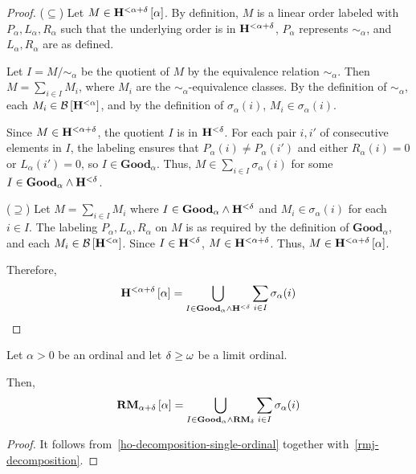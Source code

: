 \begin{proof}
  ($\subseteq$) Let $M \in \mathbf{H}^{< \alpha + \delta} \left[ {\alpha} \right]$. By definition, $M$
  is a linear order labeled with $P_\alpha, L_\alpha, R_\alpha$ such that the
  underlying order is in $\mathbf{H}^{< \alpha + \delta}$, $P_\alpha$ represents
  $\sim_\alpha$, and $L_\alpha, R_\alpha$ are as defined.

  Let $I = M / \sim_\alpha$ be the quotient of $M$ by the equivalence relation
  $\sim_\alpha$. Then $M = \sum_{i \in I} M_i$, where $M_i$ are the
  $\sim_\alpha$-equivalence classes. By the definition of $\sim_\alpha$, each
  $M_i \in \mathcal{B} \left[ {\mathbf{H}^{< \alpha}} \right]$, and by the definition of $\sigma_\alpha(i)$,
  $M_i \in \sigma_\alpha(i)$.

  Since $M \in \mathbf{H}^{< \alpha + \delta}$, the quotient $I$ is in $\mathbf{H}^{< \delta}$.
  For each pair $i, i'$ of consecutive elements in $I$, the labeling ensures that
  $P_\alpha(i) \ne P_\alpha(i')$ and either $R_\alpha(i) = 0$ or $L_\alpha(i') = 0$,
  so $I \in \mathbf{Good}_\alpha$. Thus, $M \in \sum_{i \in I} \sigma_\alpha(i)$ for
  some $I \in \mathbf{Good}_\alpha \wedge \mathbf{H}^{< \delta}$.

  ($\supseteq$) Let $M = \sum_{i \in I} M_i$ where $I \in \mathbf{Good}_\alpha
    \wedge \mathbf{H}^{< \delta}$ and $M_i \in \sigma_\alpha(i)$ for each $i \in I$. The
  labeling $P_\alpha, L_\alpha, R_\alpha$ on $M$ is as required by the definition
  of $\mathbf{Good}_\alpha$, and each $M_i \in \mathcal{B} \left[ {\mathbf{H}^{< \alpha}} \right]$. Since
  $I \in \mathbf{H}^{< \delta}$, $M \in \mathbf{H}^{< \alpha + \delta}$. Thus,
  $M \in \mathbf{H}^{< \alpha + \delta} \left[ {\alpha} \right]$.

  Therefore,
  \[
    \mathbf{H}^{< \alpha + \delta} \left[ {\alpha} \right] =
    \bigcup_{I \in \mathbf{Good}_{\alpha} \wedge \mathbf{H}^{< \delta}}
    \sum_{i \in I} \sigma_{\alpha}(i)
  \]
\end{proof}

\begin{corollary}\label{rmj-decomposition-single-ordinal}
  Let $\alpha > 0$ be an ordinal
  and let $\delta \ge \omega$ be a limit ordinal.

  Then,
  \[
    \mathbf{RM}_{\alpha + \delta} \left[ {\alpha} \right] = \bigcup_{I \in \mathbf{Good}_{\alpha} \wedge \mathbf{RM}_{\delta}}
    \sum_{i \in I} \sigma_{\alpha}(i)
  \]
\end{corollary}

\begin{proof}
  It follows from~\cref{ho-decomposition-single-ordinal}
  together with~\cref{rmj-decomposition}.
\end{proof}

